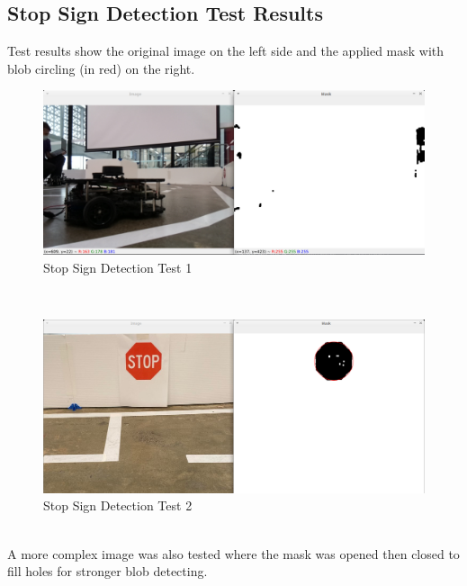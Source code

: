 \documentclass[11pt]{article}
\begin{document}
\begin{appendices}
\section{Stop Sign Detection Test Results}
\label{app:detect_stop_sign_results}

    Test results show the original image on the left side and the applied mask with blob circling (in red) on the right.

    \begin{figure}[h!]
        \centering
        \includegraphics[width=160mm]{../test/blob/results/red_blob_1.png}
        \caption{Stop Sign Detection Test 1}
        \label{fig:stopsign_detect_test_1}
    \end{figure}
    ~\\

    \begin{figure}[h!]
        \centering
        \includegraphics[width=160mm]{../test/blob/results/red_blob_2.png}
        \caption{Stop Sign Detection Test 2}
        \label{fig:stopsign_detect_test_2}
    \end{figure}
    ~\\

    A more complex image was also tested where the mask was opened then closed to fill holes for stronger blob detecting.


\end{appendices}
\end{document}
